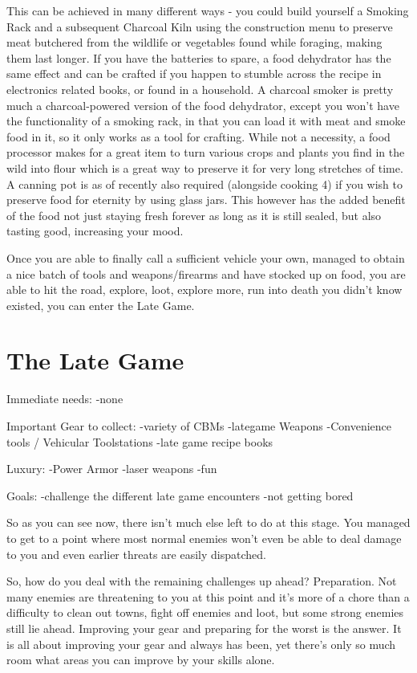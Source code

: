This can be achieved in many different ways - you could build yourself a Smoking Rack and a subsequent Charcoal Kiln using the construction menu to preserve meat butchered from the wildlife or vegetables found while foraging, making them last longer. If you have the batteries to spare, a food dehydrator has the same effect and can be crafted if you happen to stumble across the recipe in electronics related books, or found in a household. A charcoal smoker is pretty much a charcoal-powered version of the food dehydrator, except you won't have the functionality of a smoking rack, in that you can load it with meat and smoke food in it, so it only works as a tool for crafting. While not a necessity, a food processor makes for a great item to turn various crops and plants you find in the wild into flour which is a great way to preserve it for very long stretches of time. A canning pot is as of recently also required (alongside cooking 4) if you wish to preserve food for eternity by using glass jars. This however has the added benefit of the food not just staying fresh forever as long as it is still sealed, but also tasting good, increasing your mood.

Once you are able to finally call a sufficient vehicle your own, managed to obtain a nice batch of tools and weapons/firearms and have stocked up on food, you are able to hit the road, explore, loot, explore more, run into death you didn't know existed, you can enter the Late Game.

\section{The Late Game}

Immediate needs:
-none

Important Gear to collect:
-variety of CBMs
-lategame Weapons
-Convenience tools / Vehicular Toolstations
-late game recipe books

Luxury:
-Power Armor
-laser weapons
-fun

Goals:
-challenge the different late game encounters
-not getting bored

So as you can see now, there isn't much else left to do at this stage. You managed to get to a point where most normal enemies won't even be able to deal damage to you and even earlier threats are easily dispatched.

So, how do you deal with the remaining challenges up ahead? Preparation. Not many enemies are threatening to you at this point and it's more of a chore than a difficulty to clean out towns, fight off enemies and loot, but some strong enemies still lie ahead. Improving your gear and preparing for the worst is the answer. It is all about improving your gear and always has been, yet there's only so much room what areas you can improve by your skills alone.

